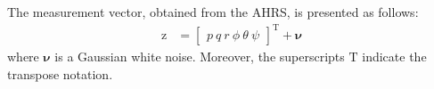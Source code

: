 \documentclass[3p]{elsarticle}
\begin{document}
    

The measurement vector, obtained from the AHRS, is presented as follows:
\begin{equation}
    \begin{split}
        \boldsymbol{\mathrm{z}} &= \begin{bmatrix}
        p \
        q \
        r \
        \phi \
        \theta \
        \psi
    \end{bmatrix}^\mathrm{T} + \boldsymbol{\nu}
    \end{split}
\end{equation}
where $\boldsymbol{\nu}$ is a Gaussian white noise. Moreover, the superscripts $\mathrm{T}$ indicate the transpose notation.
\end{document}
